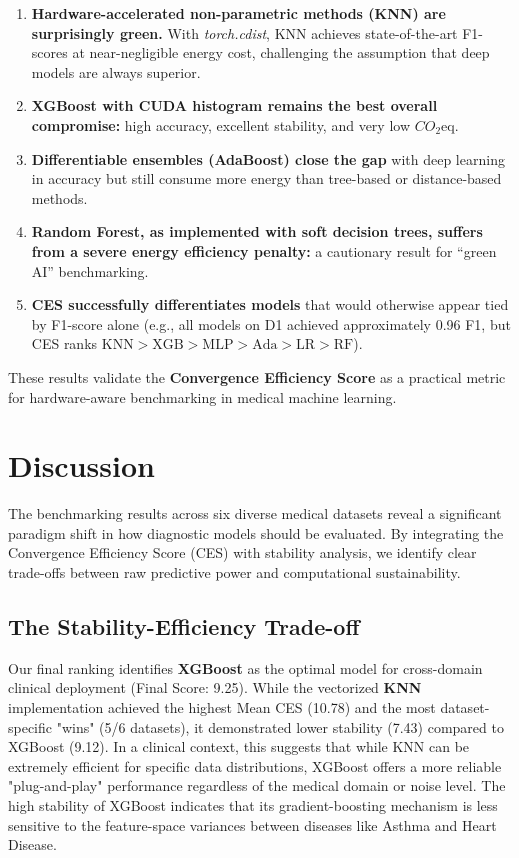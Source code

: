 \documentclass[conference]{IEEEtran}
\begin{document}
\begin{enumerate}[nosep, leftmargin=*]
    \item \textbf{Hardware-accelerated non-parametric methods (KNN) are surprisingly green.} With \textit{torch.cdist}, KNN achieves state-of-the-art F1-scores at near-negligible energy cost, challenging the assumption that deep models are always superior.  
    \item \textbf{XGBoost with CUDA histogram remains the best overall compromise:} high accuracy, excellent stability, and very low \(CO_2\)eq.  
    \item \textbf{Differentiable ensembles (AdaBoost) close the gap} with deep learning in accuracy but still consume more energy than tree-based or distance-based methods.  
    \item \textbf{Random Forest, as implemented with soft decision trees, suffers from a severe energy efficiency penalty:} a cautionary result for “green AI” benchmarking.  
    \item \textbf{CES successfully differentiates models} that would otherwise appear tied by F1-score alone (e.g., all models on D1 achieved approximately 0.96 F1, but CES ranks $\text{KNN} > \text{XGB} > \text{MLP} > \text{Ada} > \text{LR} > \text{RF}$).
\end{enumerate}
\vspace{0ex}

These results validate the \textbf{Convergence Efficiency Score} as a practical metric for hardware-aware benchmarking in medical machine learning.
\section{Discussion}

The benchmarking results across six diverse medical datasets reveal a significant paradigm shift in how diagnostic models should be evaluated. By integrating the Convergence Efficiency Score (CES) with stability analysis, we identify clear trade-offs between raw predictive power and computational sustainability.

\subsection{The Stability-Efficiency Trade-off}
Our final ranking identifies \textbf{XGBoost} as the optimal model for cross-domain clinical deployment (Final Score: 9.25). While the vectorized \textbf{KNN} implementation achieved the highest Mean CES (10.78) and the most dataset-specific "wins" (5/6 datasets), it demonstrated lower stability (7.43) compared to XGBoost (9.12). In a clinical context, this suggests that while KNN can be extremely efficient for specific data distributions, XGBoost offers a more reliable "plug-and-play" performance regardless of the medical domain or noise level. The high stability of XGBoost indicates that its gradient-boosting mechanism is less sensitive to the feature-space variances between diseases like Asthma and Heart Disease.
\end{document}
